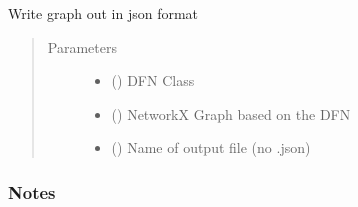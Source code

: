 \documentclass[letterpaper,10pt,english]{sphinxmanual}
\begin{document}
\begin{fulllineitems}
\label{\detokenize{pydfnworks:pydfnworks.dfnGraph.dfn2graph.dump_json_graph}}
Write graph out in json format
\begin{quote}\begin{description}
\item[{Parameters}] \leavevmode\begin{itemize}
\item {} 
 () \textendash{} DFN Class

\item {} 
 () \textendash{} NetworkX Graph based on the DFN

\item {} 
 () \textendash{} Name of output file (no .json)

\end{itemize}

\end{description}\end{quote}
\subsubsection*{Notes}

\end{fulllineitems}

\end{document}
